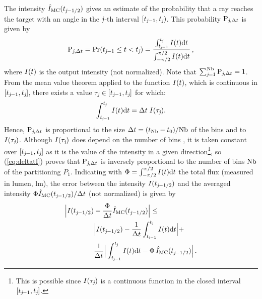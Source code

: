  The intensity $\hat{I}_{\textrm{MC}}(t_{\textit{j}-1/2})$ gives an estimate of the probability that a ray reaches the target with an angle in the $\textit{j}$-th interval
$[t_{\textit{j}-1}, t_{\textit{j}})$. This probability $\textrm{P}_{\textit{j}, \Delta t}$ is given by
\begin{equation}\label{eq:probability}
\textrm{P}_{\textit{j}, \Delta t} = \Pr(t_{\textit{j}-1}\leq t<t_{\textit{j}})=
\frac{\int_{t_{\textit{j}-1}}^{t_{\textit{j}}} I(t) \textrm{d}t}{\int_{-\pi/2}^{\pi/2}I(t) \textrm{d}t}\,,
\end{equation}
where $I(t)$ is the output intensity (not normalized).
Note that $\sum_{\textit{j}=1}^{\textrm{Nb}}\textrm{P}_{\textit{j}, \Delta t}=1$. From the mean value theorem applied to the function
$I(t)$, which is continuous in $[t_{\textit{j}-1}, t_{\textit{j}}]$, there exists a value $\tau_{\textit{j}}\in[t_{\textit{j}-1}, t_{\textit{j}}]$ for which:
 \begin{equation}\label{eq:deltatI}
\int_{t_{\textit{j}-1}}^{t_{\textit{j}}} I(t) \textrm{d}t = \Delta t\;I(\tau_{\textit{j}}).
\end{equation}
Hence, $\textrm{P}_{\textit{j}, \Delta t}$ is proportional to the size $\Delta t= (t_{\textrm{Nb}}-t_{0})/{\textrm{Nb}}$
of the bins and to $I(\tau_{\textit{j}})$. Although $I(\tau_{\textit{j}})$ does depend on the number of bins \nbin, it is taken constant over $[t_{\textit{j}-1}, t_{\textit{j}}]$ as it is the value of the intensity in a given direction\footnote{This is possible since $I(\tau_{\textit{j}})$ is a continuous function in the closed interval $[t_{\textit{j}-1}, t_{\textit{j}}]$.}, so (\ref{eq:deltatI}) proves that $\textrm{P}_{\textit{j}, \Delta t}$ is inversely proportional to the number of bins $\textrm{Nb}$ of the partitioning $P_1$.
Indicating with $\Phi = \int_{-\pi/2}^{\pi/2}I(t) \textrm{d}t$ the total flux (measured in lumen, $\textrm{lm}$),
the error between the intensity $I(t_{\textit{j}-1/2})$ and the averaged  intensity $\Phi \hat{I}_{\textrm{MC}}(t_{\textit{j}-1/2})/\Delta t$ (not normalized) is given by
\begin{equation}\label{eq:error_int}
\begin{aligned}
\Big|I(t_{\textit{j}-1/2})&-\frac{\Phi}
{\Delta t}\hat{I}_{\textrm{MC}}(t_{\textit{j}-1/2})\Big| \leq\\
 &\Big|I(t_{\textit{j}-1/2})-\frac{1}{\Delta t}\int_{t_{\textit{j}-1}}^{t_{\textit{j}}} I(t)\textrm{d}t\Big|+\\
&\frac{1}{\Delta t}\Big|\int_{t_{\textit{j}-1}}^{t_{\textit{j}}} I(t)\textrm{d}t-
\Phi\, \hat{I}_{\textrm{MC}}(t_{\textit{j}-1/2})\Big| \,.
\end{aligned}
\end{equation}
